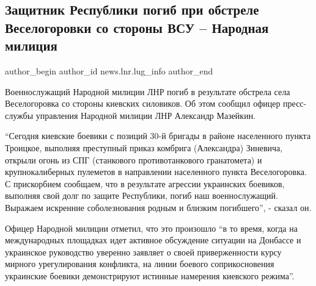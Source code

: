  
 
 
 
 
 
\subsection{Защитник Республики погиб при обстреле Веселогоровки со стороны ВСУ – Народная милиция}
\label{sec:27_01_2022.stz.news.lnr.lug_info.3.zaschitnik_respubliki_smert}
 
\ifcmt
 author_begin
   author_id news.lnr.lug_info
 author_end
\fi

Военнослужащий Народной милиции ЛНР погиб в результате обстрела села
Веселогоровка со стороны киевских силовиков. Об этом сообщил офицер
пресс-службы управления Народной милиции ЛНР Александр Мазейкин.

\enquote{Сегодня киевские боевики с позиций 30-й бригады в районе населенного пункта
Троицкое, выполняя преступный приказ комбрига (Александра) Зиневича, открыли
огонь из СПГ (станкового противотанкового гранатомета) и крупнокалиберных
пулеметов в направлении населенного пункта Веселогоровка. С прискорбием
сообщаем, что в результате агрессии украинских боевиков, выполняя свой долг по
защите Республики, погиб наш военнослужащий. Выражаем искренние соболезнования
родным и близким погибшего}, - сказал он.


Офицер Народной милиции отметил, что это произошло \enquote{в то время, когда на
международных площадках идет активное обсуждение ситуации на Донбассе и
украинское руководство уверенно заявляет о своей приверженности курсу мирного
урегулирования конфликта, на линии боевого соприкосновения украинские боевики
демонстрируют истинные намерения киевского режима}.

